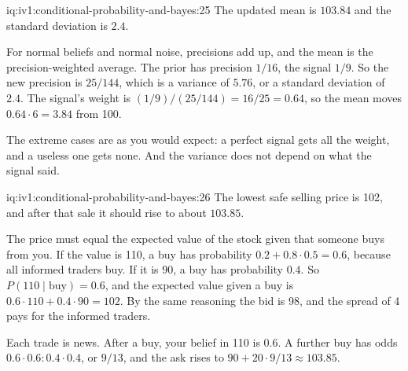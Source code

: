 \enlargethispage{-3\baselineskip}%
\begin{solution}{iq:iv1:conditional-probability-and-bayes:25}
The updated mean is $103.84$ and the standard deviation is $2.4$.

For normal beliefs and normal noise, precisions add up, and the mean is the precision-weighted average. The prior has precision $1/16$, the signal $1/9$. So the new precision is $25/144$, which is a variance of $5.76$, or a standard deviation of $2.4$. The signal's weight is $(1/9)/(25/144) = 16/25 = 0.64$, so the mean moves $0.64 \cdot 6 = 3.84$ from 100.

The extreme cases are as you would expect: a perfect signal gets all the weight, and a useless one gets none. And the variance does not depend on what the signal said.

\end{solution}

\begin{solution}{iq:iv1:conditional-probability-and-bayes:26}
The lowest safe selling price is 102, and after that sale it should rise to about $103.85$.

The price must equal the expected value of the stock given that someone buys from you. If the value is 110, a buy has probability $0.2 + 0.8 \cdot 0.5 = 0.6$, because all informed traders buy. If it is 90, a buy has probability $0.4$. So $P(110 \mid \text{buy}) = 0.6$, and the expected value given a buy is $0.6 \cdot 110 + 0.4 \cdot 90 = 102$. By the same reasoning the bid is 98, and the spread of 4 pays for the informed traders.

Each trade is news. After a buy, your belief in 110 is $0.6$. A further buy has odds $0.6 \cdot 0.6 : 0.4 \cdot 0.4$, or $9/13$, and the ask rises to $90 + 20 \cdot 9/13 \approx 103.85$.

\end{solution}

